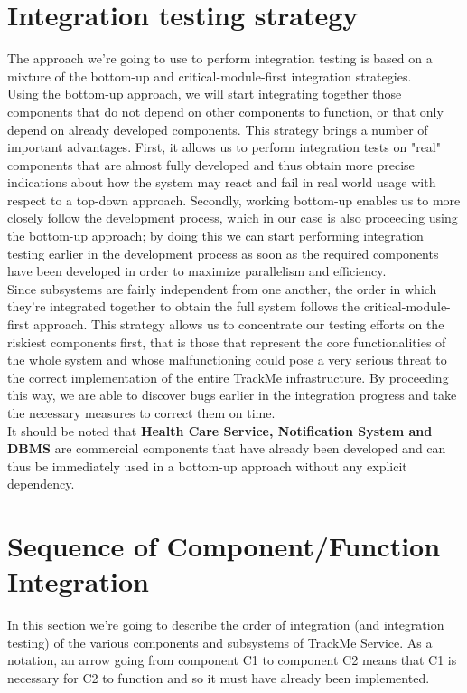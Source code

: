\documentclass[a4paper, hidelinks, 12pt]{report}
\begin{document}
	\section{Integration testing strategy}
	The approach we're going to use to perform integration testing is based on a mixture of the bottom-up and critical-module-first integration strategies.\\
	
	Using the bottom-up approach, we will start integrating together those components that do not depend on other components to function, or that only depend on already developed components. This strategy brings a number of important advantages. First, it allows us to perform integration tests on "real" components that are almost fully developed and thus obtain more precise indications about how the system may react and fail in real world usage with respect to a top-down approach. Secondly, working bottom-up enables us to more closely follow the development process, which in our case is also proceeding using the bottom-up approach; by doing this we can start performing integration testing earlier in the development process as soon as the required components have been developed in order to maximize parallelism and efficiency.\\
	
	Since subsystems are fairly independent from one another, the order in which they're integrated together to obtain the full system follows the critical-module-first approach. This strategy allows us to concentrate our testing efforts on the riskiest components first, that is those that represent the core functionalities of the whole system and whose malfunctioning could pose a very serious threat to the correct implementation of the entire TrackMe infrastructure. By proceeding this way, we are able to discover bugs earlier in the integration progress and take the necessary measures to correct them on time.\\
	
	It should be noted that \textbf{Health Care Service, Notification System and DBMS} are commercial components that
have already been developed and can thus be immediately used in a bottom-up approach without any explicit dependency.
			
	\section{Sequence of Component/Function Integration}
	In this section we're going to describe the order of integration (and integration testing) of the various components and subsystems of TrackMe Service. As a notation, an arrow going from component C1 to component C2 means that C1 is necessary for C2 to function and so it must have already been implemented.
				
\end{document}
